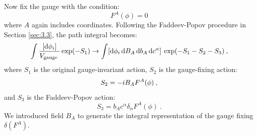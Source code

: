 Now fix the gauge with the condition:
\begin{equation}
	F^{A}(\phi)=0  \label{4.2.2}
\end{equation}
where $A$ again includes coordinates. Following the Faddeev-Popov procedure in Section \ref{sec:3.3}, the path integral becomes:
\begin{equation}
	\int \frac{[\mathrm{d} \phi_{i}]}{V_{\text {gauge }}} \exp (-S_{1}) \rightarrow \int [\mathrm{d} \phi_{i}\, \mathrm{d} B_{A} \,\mathrm{d} b_{A}\, \mathrm{d} c^{\alpha}] \:
	\exp (-S_{1}-S_{2}-S_{3}) \:, \label{4.2.3}
\end{equation}
where $S_1$ is the original gauge-invariant action, $S_2$ is the gauge-fixing action:
\begin{equation}
	S_{2}=-i B_{A} F^{A}(\phi) \:, \label{4.2.4}
\end{equation}
and $S_3$ is the Faddeev-Popov action:
\begin{equation}
	S_{3}=b_{A} c^{\alpha} \delta_{\alpha} F^{A}(\phi) \:. \label{4.2.5}
\end{equation}
We introduced field $B_A$ to generate the integral representation of the gauge fixing $\delta(F^{A})$.

